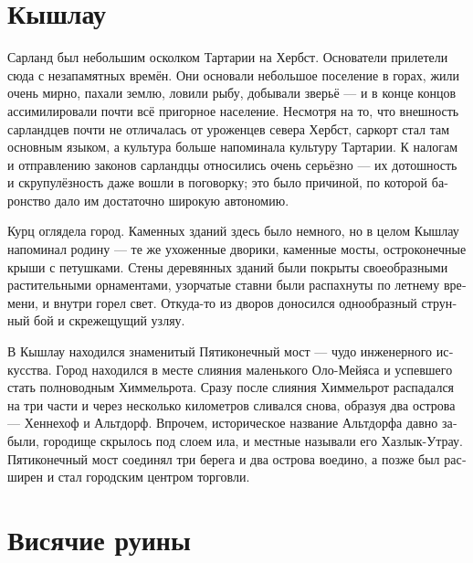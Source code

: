 \documentclass[a4paper,10pt,fleqn]{book}\usepackage{polyglossia}\setdefaultlanguage[babelshorthands=true]{russian}\setotherlanguage{english}\defaultfontfeatures{Ligatures=TeX,Mapping=tex-text}\usepackage{xcolor}\newcommand{\ml}[3]{#2}
\begin{document}
\section{Кышлау}

Сарланд был небольшим осколком Тартарии на Хербст.
Основатели прилетели сюда с незапамятных времён.
Они основали небольшое поселение в горах, жили очень мирно, пахали землю, ловили рыбу, добывали зверьё --- и в конце концов ассимилировали почти всё пригорное население.
Несмотря на то, что внешность сарландцев почти не отличалась от уроженцев севера Хербст, саркорт стал там основным языком, а культура больше напоминала культуру Тартарии.
К налогам и отправлению законов сарландцы относились очень серьёзно --- их дотошность и скрупулёзность даже вошли в поговорку;
это было причиной, по которой баронство дало им достаточно широкую автономию.

Курц оглядела город.
Каменных зданий здесь было немного, но в целом Кышлау напоминал родину --- те же ухоженные дворики, каменные мосты, остроконечные крыши с петушками.
Стены деревянных зданий были покрыты своеобразными растительными орнаментами, узорчатые ставни были распахнуты по летнему времени, и внутри горел свет.
Откуда-то из дворов доносился однообразный струнный бой и скрежещущий узляу.

\ml{$0$}
{В Кышлау находился знаменитый Пятиконечный мост --- чудо инженерного искусства.}
{Qyschlau housed the famous Five-pointed Bridge, an engineering marvel.}
\ml{$0$}
{Город находился в месте слияния маленького Оло-Мейяса и успевшего стать полноводным Химмельрота.}
{The town was located at the confluence of little Olo-Mej\o{}s and already flooding Himmelrot.}
Сразу после слияния Химмельрот распадался на три части и через несколько километров сливался снова, образуя два острова --- Хеннехоф и Альтдорф.
\ml{$0$}
{Впрочем, историческое название Альтдорфа давно забыли, городище скрылось под слоем ила, и местные называли его Хазлык-Утрау.}
{However, the historical name of Altdorf was forgotten long ago, the burg was hidden under sludge, and locals called the island Ha\dh{}lyq-Utrau.}
Пятиконечный мост соединял три берега и два острова воедино, а позже был расширен и стал городским центром торговли.

\section{Висячие руины}
\end{document}
